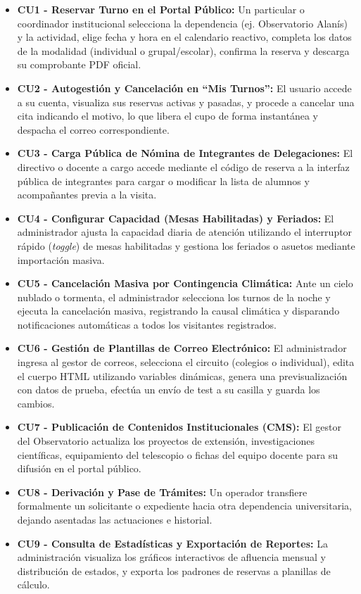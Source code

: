 \begin{itemize}
    \item \textbf{CU1 - Reservar Turno en el Portal Público:} Un particular o coordinador institucional selecciona la dependencia (ej. Observatorio Alanís) y la actividad, elige fecha y hora en el calendario reactivo, completa los datos de la modalidad (individual o grupal/escolar), confirma la reserva y descarga su comprobante PDF oficial.
    \item \textbf{CU2 - Autogestión y Cancelación en ``Mis Turnos'':} El usuario accede a su cuenta, visualiza sus reservas activas y pasadas, y procede a cancelar una cita indicando el motivo, lo que libera el cupo de forma instantánea y despacha el correo correspondiente.
    \item \textbf{CU3 - Carga Pública de Nómina de Integrantes de Delegaciones:} El directivo o docente a cargo accede mediante el código de reserva a la interfaz pública de integrantes para cargar o modificar la lista de alumnos y acompañantes previa a la visita.
    \item \textbf{CU4 - Configurar Capacidad (Mesas Habilitadas) y Feriados:} El administrador ajusta la capacidad diaria de atención utilizando el interruptor rápido (\textit{toggle}) de mesas habilitadas y gestiona los feriados o asuetos mediante importación masiva.
    \item \textbf{CU5 - Cancelación Masiva por Contingencia Climática:} Ante un cielo nublado o tormenta, el administrador selecciona los turnos de la noche y ejecuta la cancelación masiva, registrando la causal climática y disparando notificaciones automáticas a todos los visitantes registrados.
    \item \textbf{CU6 - Gestión de Plantillas de Correo Electrónico:} El administrador ingresa al gestor de correos, selecciona el circuito (colegios o individual), edita el cuerpo HTML utilizando variables dinámicas, genera una previsualización con datos de prueba, efectúa un envío de test a su casilla y guarda los cambios.
    \item \textbf{CU7 - Publicación de Contenidos Institucionales (CMS):} El gestor del Observatorio actualiza los proyectos de extensión, investigaciones científicas, equipamiento del telescopio o fichas del equipo docente para su difusión en el portal público.
    \item \textbf{CU8 - Derivación y Pase de Trámites:} Un operador transfiere formalmente un solicitante o expediente hacia otra dependencia universitaria, dejando asentadas las actuaciones e historial.
    \item \textbf{CU9 - Consulta de Estadísticas y Exportación de Reportes:} La administración visualiza los gráficos interactivos de afluencia mensual y distribución de estados, y exporta los padrones de reservas a planillas de cálculo.
\end{itemize}

